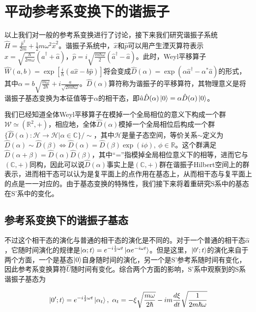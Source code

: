 \documentclass[a4paper]{article}
\begin{document}
    
    \section{平动参考系变换下的谐振子}

        以上我们对一般的参考系变换进行了讨论，接下来我们研究谐振子系统$\hat{H}=\frac{\hat{p}^2}{2m}+\frac{1}{2}m\omega^2\hat{x}^2$。谐振子系统中，$\hat{x}$和$\hat{p}$可以用产生湮灭算符表示$\hat{x}=\sqrt{\frac{\hbar}{2m\omega}}(\hat{a}^\dagger+\hat{a})$，$\hat{p}=i\sqrt{\frac{m\hbar\omega}{2}}(\hat{a}^\dagger-\hat{a})$。此时，Weyl平移算子$\hat{W}(a,b)=\exp[\frac{i}{\hbar}(a\hat{x}-b\hat{p})]$将会变成$\hat{D}(\alpha)=\exp(\alpha\hat{a}^\dagger-\alpha^*\hat{a})$的形式，其中$\alpha=b\sqrt{\frac{m\omega}{2\hbar}}+i\frac{a}{\sqrt{2m\hbar\omega}}$。$\hat{D}(\alpha)$算符称为谐振子的平移算符，其物理意义是将谐振子基态变换为本征值等于$\alpha$的相干态，即$\hat{a}\hat{D}(\alpha)\ket{0}=\alpha\hat{D}(\alpha)\ket{0}$。

        我们已经知道全体Weyl平移算子在模掉一个全局相位的意义下构成一个群$\mathcal{W}\simeq(\mathbb{R}^2,+)$，相应地，全体$\hat{D}(\alpha)$模掉一个全局相位后构成一个群$\{\hat{D}(\alpha):\mathcal{H}\to\mathcal{H}|\alpha\in\mathbb{C}\}/\sim$，其中$\mathcal{H}$是量子态空间，等价关系$\sim$定义为$\hat{D}(\alpha)\sim\hat{D}(\beta) \Leftrightarrow \hat{D}(\alpha)=\hat{D}(\beta)\exp(i\phi),\ \phi\in\mathbb{R}$。这个群满足$\hat{D}(\alpha+\beta)=\hat{D}(\alpha)\hat{D}(\beta)$，其中“=”指模掉全局相位意义下的相等，进而它与$(\mathbb{C},+)$同构，因此可以说$\hat{D}(\alpha)$事实上是$(\mathbb{C},+)$群在谐振子Hilbert空间上的群表示，进而相干态可以认为是复平面上的点作用在基态上，从而相干态与复平面上的点是一一对应的。由于基态变换的特殊性，我们接下来将着重研究S系中的基态在S'系中的变化。

    \subsection{参考系变换下的谐振子基态}

        不过这个相干态的演化与普通的相干态的演化是不同的。对于一个普通的相干态$\hat{\alpha}$，它随时间演化的规律是$\ket{\alpha;t}=e^{-i\frac{1}{2}\omega t}\ket{\alpha e^{-i\omega t}}$。但是这里，$\ket{0';t}$的演化来自于两个方面，一个是基态$\ket{0}$自身随时间的演化，另一个是S'参考系随时间有变化，因此参考系变换算符$\hat{U}$随时间有变化。综合两个方面的影响，S'系中观察到的S系谐振子基态为

        \begin{equation}
            \ket{0';t} = e^{-i\frac{1}{2}\omega t}\ket{\alpha_t}, \ \alpha_t=-\xi\sqrt{\frac{m\omega}{2\hbar}}-im\frac{d\xi}{dt}\sqrt{\frac{1}{2m\hbar\omega}}
        \end{equation}
\end{document}

